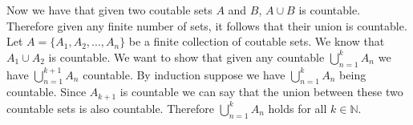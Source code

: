 \documentclass{article}
\begin{document}
Now we have that given two coutable sets $A$ and $B$, $A \cup B$ is countable. Therefore given any finite number of sets, it follows that their union is countable. Let $A = \{ A_1, A_2, ... , A_n\}$ be a finite collection of coutable sets. We know that $A_1 \cup A_2$ is countable. We want to show that given any countable $\bigcup_{n = 1}^{k} A_n$ we have $\bigcup_{n = 1}^{k+1} A_n$ countable. By induction suppose we have  $\bigcup_{n = 1}^{k} A_n$ being countable. Since $A_{k+1}$ is countable we can say that the union between these two countable sets is also countable. Therefore $\bigcup_{n = 1}^{k} A_n$ holds for all $k \in \mathbb{N}$.
\end{document}

